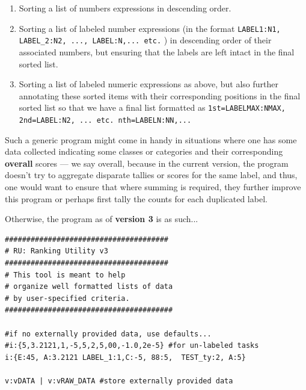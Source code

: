 \documentclass[a4paper, 18pt]{book} %
\begin{document}
{\begin{enumerate}
\item Sorting a list of numbers expressions in descending order.
\item Sorting a list of labeled number expressions (in the format \texttt{LABEL1:N1, LABEL\_2:N2, ..., LABEL:N,... etc.} ) in descending order of their associated numbers, but ensuring that the labels are left intact in the final sorted list.
\item Sorting a list of labeled numeric expressions as above, but also further annotating these sorted items with their corresponding positions in the final sorted list so that we have a final list formatted as \texttt{1st=LABELMAX:NMAX, 2nd=LABEL:N2, ... etc. nth=LABELN:NN,...}
\end{enumerate}

\vspace{2em}

Such a generic program might come in handy in situations where one has some data collected indicating some classes or categories and their corresponding \textbf{overall} scores --- we say overall, because in the current version, the program doesn't try to aggregate disparate tallies or scores for the same label, and thus, one would want to ensure that where summing is required, they further improve this program or perhaps first tally the counts for each duplicated label.


\vspace{2em}

Otherwise, the program as of \textbf{version 3} is as such...


\vspace{2em}


{
  \begin{tcolorbox}[teaterminalstyle, title=TEA Program: Ranking Utility v.3, breakable]
  \begin{lstlisting}[language=TEA,breaklines=true,]
######################################
# RU: Ranking Utility v3
######################################
# This tool is meant to help
# organize well formatted lists of data
# by user-specified criteria.
#######################################

#if no externally provided data, use defaults...
#i:{5,3.2121,1,-5,5,2,5,00,-1.0,2e-5} #for un-labeled tasks
i:{E:45, A:3.2121 LABEL_1:1,C:-5, 88:5,  TEST_ty:2, A:5}

v:vDATA | v:vRAW_DATA #store externally provided data


\end{lstlisting}
\end{tcolorbox}}}
\end{document}

